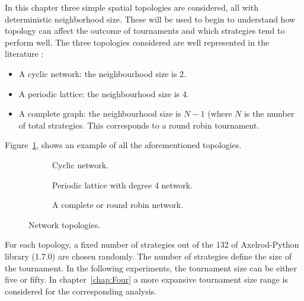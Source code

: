 In this chapter three simple spatial topologies are considered, all with
deterministic neighborhood size. These will be used to begin to understand how
topology can affect the outcome of tournaments
and which strategies tend to perform well. The three topologies considered are
well represented in the literature :  %

\begin{itemize}
    \item A cyclic network: the neighbourhood size is 2. %
    \item A periodic lattice: the neighbourhood size is 4. %
    \item A complete graph: the neighbourhood size is \(N-1\) (where \(N\) is
        the number of total strategies. This corresponds to a round robin
        tournament. %
\end{itemize}

Figure~\ref{fig:networks}, shows an example of all the aforementioned topologies.

\begin{figure}[!hbtp]  %
\centering
    \begin{subfigure}[h]{0.45\textwidth}
    \centering
        
    \caption{Cyclic network.}
    \end{subfigure}
\hfill
    \begin{subfigure}[h]{0.52\textwidth}\centering
    \centering
        
    \caption{Periodic lattice with degree 4 network.}
    \end{subfigure}
\hfill
    \begin{subfigure}[h]{0.52\textwidth}\centering
    \centering
    
    \caption{A complete or round robin network.}
    \end{subfigure}
\caption{Network topologies.}
\label{fig:networks}
\end{figure}


For each topology, a fixed number of strategies out of the 132 of Axelrod-Python
library (1.7.0) are chosen randomly. The number of strategies define the size of the
tournament. In the following experiments, the tournament size can be either
five or fifty. In chapter~\ref{chap:Four} a more expansive tournament size range is
considered for the corresponding analysis. %

